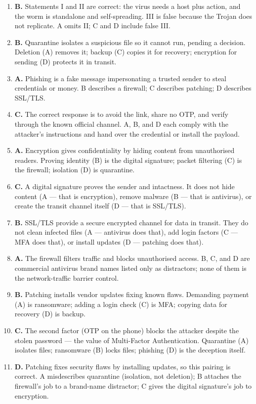 \documentclass[11pt]{article}
\begin{document}
\begin{enumerate}[label=\textbf{Q\arabic*.}, leftmargin=*]
\item \textbf{B.} Statements I and II are correct: the virus needs a host
  plus action, and the worm is standalone and self-spreading. III is false
  because the Trojan does not replicate. A omits II; C and D include false
  III.
\item \textbf{B.} Quarantine isolates a suspicious file so it cannot run,
  pending a decision. Deletion (A) removes it; backup (C) copies it for
  recovery; encryption for sending (D) protects it in transit.
\item \textbf{A.} Phishing is a fake message impersonating a trusted sender
  to steal credentials or money. B describes a firewall; C describes
  patching; D describes SSL/TLS.
\item \textbf{C.} The correct response is to avoid the link, share no OTP,
  and verify through the known official channel. A, B, and D each comply
  with the attacker's instructions and hand over the credential or install
  the payload.
\item \textbf{A.} Encryption gives confidentiality by hiding content from
  unauthorised readers. Proving identity (B) is the digital signature;
  packet filtering (C) is the firewall; isolation (D) is quarantine.
\item \textbf{C.} A digital signature proves the sender and intactness. It
  does not hide content (A --- that is encryption), remove malware (B ---
  that is antivirus), or create the transit channel itself (D --- that is
  SSL/TLS).
\item \textbf{B.} SSL/TLS provide a secure encrypted channel for data in
  transit. They do not clean infected files (A --- antivirus does that),
  add login factors (C --- MFA does that), or install updates (D ---
  patching does that).
\item \textbf{A.} The firewall filters traffic and blocks unauthorised
  access. B, C, and D are commercial antivirus brand names listed only as
  distractors; none of them is the network-traffic barrier control.
\item \textbf{B.} Patching installs vendor updates fixing known flaws.
  Demanding payment (A) is ransomware; adding a login check (C) is MFA;
  copying data for recovery (D) is backup.
\item \textbf{C.} The second factor (OTP on the phone) blocks the attacker
  despite the stolen password --- the value of Multi-Factor
  Authentication. Quarantine (A) isolates files; ransomware (B) locks
  files; phishing (D) is the deception itself.
\item \textbf{D.} Patching fixes security flaws by installing updates, so
  this pairing is correct. A misdescribes quarantine (isolation, not
  deletion); B attaches the firewall's job to a brand-name distractor;
  C gives the digital signature's job to encryption.


\end{enumerate}
\end{document}
